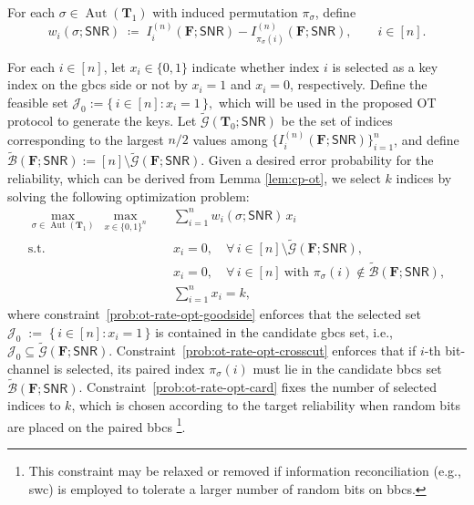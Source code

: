 \documentclass[onecolumn]{IEEEtran} %
\newcommand{\bF}{\mathbf F}
\newcommand{\1}{\mathbbm{1}}
\DeclareMathOperator{\Aut}{Aut}
\theoremstyle{boldremark}
\newcommand{\bT}{\mathbf{T}}
\begin{document}
For each $\sigma\in\Aut(\bT_1)$ with induced permutation $\pi_\sigma$, define
\[
  w_i(\sigma;\textsf{SNR})
  \;\coloneqq\;
  I_i^{(n)}(\bF;\textsf{SNR})
  -
  I_{\pi_\sigma(i)}^{(n)}(\bF;\textsf{SNR}),
  \qquad i\in[n].
\]


For each $i\in[n]$, let $x_i\in\{0,1\}$ indicate whether index $i$ is selected as a key index on the \gls{gbcs} side or not by $x_i=1$ and $x_i=0$, respectively.
Define the feasible set $\mathcal J_0 := \{\, i\in[n] : x_i=1 \,\},$ which will be used in the proposed OT protocol to generate the keys.
Let $\tilde{\mathcal{G}}(\bT_0;\textsf{SNR})$ be the set of indices corresponding to the largest $n/2$
values among $\{I_i^{(n)}(\bF;\textsf{SNR})\}_{i=1}^{n}$, and define $\tilde{\mathcal{B}}(\bF;\textsf{SNR}) := [n]\setminus \tilde{\mathcal{G}}(\bF;\textsf{SNR}).$ Given a desired error probability for the reliability, which can be derived from Lemma \ref{lem:cp-ot}, we select $k$ indices by solving the following optimization problem:
\begin{subequations}\label{prob:ot-rate-opt}
\begin{align}
\max_{\sigma\in\Aut(\bT_1)}\ \max_{x\in\{0,1\}^{n}}\quad
& \sum_{i=1}^{n} w_i(\sigma;\textsf{SNR})\,x_i
\label{prob:ot-rate-opt-obj}
\\
\text{s.t.}\quad
& x_i = 0,\quad \forall\, i\in[n]\setminus \tilde{\mathcal{G}}(\bF;\textsf{SNR}),
\label{prob:ot-rate-opt-goodside}
\\
& x_i = 0,\quad \forall\, i\in[n]\ \text{with }\pi_\sigma(i)\notin \tilde{\mathcal{B}}(\bF;\textsf{SNR}),
\label{prob:ot-rate-opt-crosscut}
\\
& \sum_{i=1}^{n} x_i = k,\label{prob:ot-rate-opt-card}
\end{align}
\end{subequations}
where constraint~\eqref{prob:ot-rate-opt-goodside} enforces that the selected set $\mathcal J_0 \;:=\; \{\, i\in[n] : x_i=1 \,\}$
is contained in the candidate \gls{gbcs} set, i.e., $\mathcal J_0\subseteq \tilde{\mathcal{G}}(\bF;\textsf{SNR})$.
Constraint~\eqref{prob:ot-rate-opt-crosscut} enforces that if $i$-th bit-channel is selected, its paired index $\pi_\sigma(i)$ must lie
in the candidate \gls{bbcs} set $\tilde{\mathcal{B}}(\bF;\textsf{SNR})$.
Constraint~\eqref{prob:ot-rate-opt-card} fixes the number of selected indices to
$k$, which is chosen according to the target reliability when random bits are
placed on the paired \gls{bbcs}
\footnote{This constraint may be relaxed or removed if information reconciliation
(e.g., \gls{swc}) is employed to tolerate a larger number of random bits on
\gls{bbcs}.}.
\end{document}
